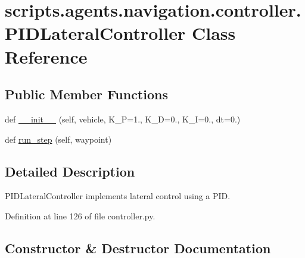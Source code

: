 \hypertarget{classscripts_1_1agents_1_1navigation_1_1controller_1_1PIDLateralController}{}\section{scripts.\+agents.\+navigation.\+controller.\+P\+I\+D\+Lateral\+Controller Class Reference}
\label{classscripts_1_1agents_1_1navigation_1_1controller_1_1PIDLateralController}
\subsection*{Public Member Functions}
\begin{DoxyCompactItemize}
\item 
def \hyperlink{classscripts_1_1agents_1_1navigation_1_1controller_1_1PIDLateralController_a765e53c4705060d912d7938af72654af}{\+\_\+\+\_\+init\+\_\+\+\_\+} (self, vehicle, K\+\_\+P=1., K\+\_\+D=0., K\+\_\+I=0., dt=0.)
\item 
def \hyperlink{classscripts_1_1agents_1_1navigation_1_1controller_1_1PIDLateralController_a6f0bbd083ff0c9b013ca8b4ce476f24e}{run\+\_\+step} (self, waypoint)
\end{DoxyCompactItemize}


\subsection{Detailed Description}
\begin{DoxyVerb}PIDLateralController implements lateral control using a PID.
\end{DoxyVerb}
 

Definition at line 126 of file controller.\+py.



\subsection{Constructor \& Destructor Documentation}
\mbox{\label{classscripts_1_1agents_1_1navigation_1_1controller_1_1PIDLateralController_a765e53c4705060d912d7938af72654af}} 
